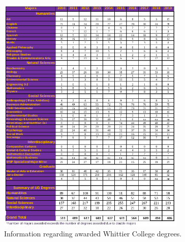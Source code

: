 \documentclass{article}
\begin{document}
\begin{figure}[ht]
\centering
\includegraphics[width=0.8\textwidth]{figures/degree.png}
\caption{\label{fig:degree} Information regarding awarded Whittier College degrees.}
\end{figure}

\clearpage
\end{document}
